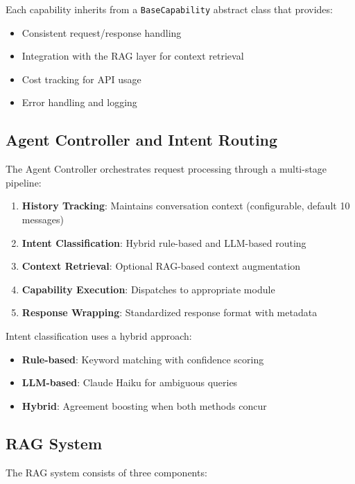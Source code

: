 \documentclass[12pt,a4paper]{article}
\begin{document}
Each capability inherits from a \texttt{BaseCapability} abstract class that provides:
\begin{itemize}
    \item Consistent request/response handling
    \item Integration with the RAG layer for context retrieval
    \item Cost tracking for API usage
    \item Error handling and logging
\end{itemize}

\subsection{Agent Controller and Intent Routing}

The Agent Controller orchestrates request processing through a multi-stage pipeline:

\begin{enumerate}
    \item \textbf{History Tracking}: Maintains conversation context (configurable, default 10 messages)
    \item \textbf{Intent Classification}: Hybrid rule-based and LLM-based routing
    \item \textbf{Context Retrieval}: Optional RAG-based context augmentation
    \item \textbf{Capability Execution}: Dispatches to appropriate module
    \item \textbf{Response Wrapping}: Standardized response format with metadata
\end{enumerate}

Intent classification uses a hybrid approach:
\begin{itemize}
    \item \textbf{Rule-based}: Keyword matching with confidence scoring
    \item \textbf{LLM-based}: Claude Haiku for ambiguous queries
    \item \textbf{Hybrid}: Agreement boosting when both methods concur
\end{itemize}

\subsection{RAG System}

The RAG system consists of three components:
\end{document}
